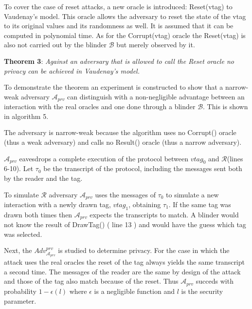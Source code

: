     To cover the case of reset attacks, a new oracle is introduced: Reset(vtag) to Vaudenay's model. This oracle allows the adversary to reset the state of the vtag
    to its original values and its randomness as well. It is assumed that it can be computed in polynomial time. As for the Corrupt(vtag) oracle the Reset(vtag) is also not carried out
    by the blinder $\mathcal{B}$ but merely observed by it.

    \textbf{Theorem 3}: \textit{Against an adversary that is allowed to call the Reset oracle no privacy can be achieved in Vaudenay's model.}

    To demonstrate the theorem an experiment is constructed to show that a narrow-weak adversary $\mathcal{A}_{prv}$ can distinguish with a non-negligible advantage 
    between an interaction with the real oracles and one done through a blinder $\mathcal{B}$. This is shown in algorithm 5.
    
    The adversary is narrow-weak because the algorithm uses no Corrupt() oracle (thus a weak adversary) and calls no Result() oracle 
    (thus a narrow adversary).

    $\mathcal{A}_{prv}$ eavesdrops a complete execution of the protocol between $vtag_{0}$ and $\mathcal{R}$(lines 6-10). Let $\tau_{0}$ be the transcript of the protocol, including the messages
    sent both by the reader and the tag.

    To simulate $\mathcal{R}$ adversary $\mathcal{A}_{prv}$ uses the messages of $\tau_{0}$ to simulate a new interaction with a newly drawn tag, $vtag_{1}$, obtaining $\tau_{1}$. If the same tag was
    drawn both times then $\mathcal{A}_{prv}$ expects the transcripts to match. A blinder would not know the result of DrawTag() ( line 13 ) and would have the guess which tag was
    selected. 
    
    Next, the $Adv_{\mathcal{A}_{prv}}^{prv}$ is studied to determine privacy. For the case in which the attack uses the real oracles the reset of the tag always yields the same transcript a second time. 
    The messages of the reader are the same by design of the attack and those of the tag also match because of the reset. Thus $\mathcal{A}_{prv}$ succeds with probability $1-\epsilon(l)$
    where $\epsilon$ is a negligible function and $l$ is the security parameter.

